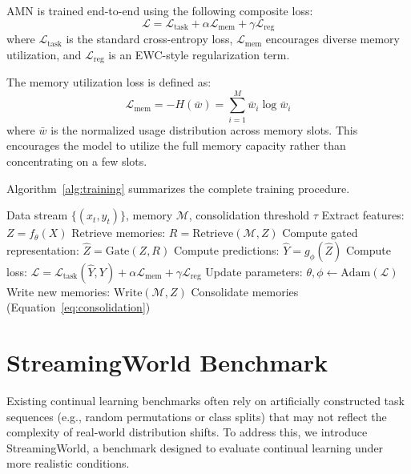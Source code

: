 \documentclass[11pt]{article}
\begin{document}
AMN is trained end-to-end using the following composite loss:
\begin{equation}
    \mathcal{L} = \mathcal{L}_{\text{task}} + \alpha \mathcal{L}_{\text{mem}} + \gamma \mathcal{L}_{\text{reg}}
\end{equation}
where $\mathcal{L}_{\text{task}}$ is the standard cross-entropy loss, $\mathcal{L}_{\text{mem}}$ encourages diverse memory utilization, and $\mathcal{L}_{\text{reg}}$ is an EWC-style regularization term.

The memory utilization loss is defined as:
\begin{equation}
    \mathcal{L}_{\text{mem}} = -H(\bar{w}) = \sum_{i=1}^{M} \bar{w}_i \log \bar{w}_i
\end{equation}
where $\bar{w}$ is the normalized usage distribution across memory slots. This encourages the model to utilize the full memory capacity rather than concentrating on a few slots.

Algorithm~\ref{alg:training} summarizes the complete training procedure.

\begin{algorithm}
\caption{AMN Training}
\label{alg:training}
\begin{algorithmic}[1]
\REQUIRE Data stream $\{(x_t, y_t)\}$, memory $\mathcal{M}$, consolidation threshold $\tau$
    \STATE Extract features: $Z = f_\theta(X)$
    \STATE Retrieve memories: $R = \text{Retrieve}(\mathcal{M}, Z)$
    \STATE Compute gated representation: $\hat{Z} = \text{Gate}(Z, R)$
    \STATE Compute predictions: $\hat{Y} = g_\phi(\hat{Z})$
    \STATE Compute loss: $\mathcal{L} = \mathcal{L}_{\text{task}}(\hat{Y}, Y) + \alpha \mathcal{L}_{\text{mem}} + \gamma \mathcal{L}_{\text{reg}}$
    \STATE Update parameters: $\theta, \phi \leftarrow \text{Adam}(\mathcal{L})$
    \STATE Write new memories: $\text{Write}(\mathcal{M}, Z)$
        \STATE Consolidate memories (Equation~\ref{eq:consolidation})
    \ENDIF
\ENDFOR
\end{algorithmic}
\end{algorithm}

\section{StreamingWorld Benchmark}
\label{sec:benchmark}

Existing continual learning benchmarks often rely on artificially constructed task sequences (e.g., random permutations or class splits) that may not reflect the complexity of real-world distribution shifts. To address this, we introduce StreamingWorld, a benchmark designed to evaluate continual learning under more realistic conditions.
\end{document}
